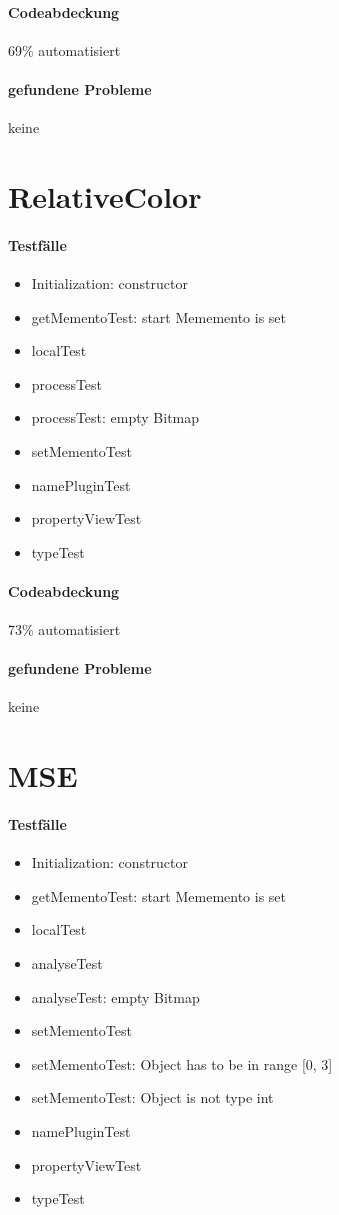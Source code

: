 \paragraph*{Codeabdeckung}
69\% automatisiert

\paragraph*{gefundene Probleme}
keine

\section{RelativeColor}
\paragraph*{Testfälle}
\begin{itemize}
\item Initialization: constructor
\item getMementoTest: start Mememento is set
\item localTest
\item processTest
\item processTest: empty Bitmap
\item setMementoTest
\item namePluginTest
\item propertyViewTest
\item typeTest
\end{itemize}

\paragraph*{Codeabdeckung}
73\% automatisiert

\paragraph*{gefundene Probleme}
keine

\section{MSE}
\paragraph*{Testfälle}
\begin{itemize}
\item Initialization: constructor
\item getMementoTest: start Mememento is set
\item localTest
\item analyseTest
\item analyseTest: empty Bitmap
\item setMementoTest
\item setMementoTest: Object has to be in range [0, 3]
\item setMementoTest: Object is not type int
\item namePluginTest
\item propertyViewTest
\item typeTest
\end{itemize}

